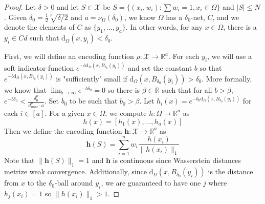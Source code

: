 \documentclass[12pt]{article}
\newcommand{\R}{\mathbb R}
\begin{document}
\begin{proof}
    Let $\delta > 0$ and let $S \in \mathcal{X}$ be $S = \{(x_i, w_i) : \sum w_i = 1, x_i \in \Omega\}$ and $|S| \leq N$. Given $\delta_0 = \frac{1}{2}\sqrt[p]{\delta/2}$ and $a = \nu_\Omega(\delta_0)$, we know $\Omega$ has a $\delta_0$-net, $C$, and we denote the elements of $C$ as  $\{y_1, \dots, y_a\}$. In other words, for any $x \in \Omega$, there is a $y_i \in Cd$ such that $\mathrm{d}_\Omega(x, y_i) < \delta_0$. 
    
    First, we will define an encoding function $\rho: \mathcal{X} \to \R^a$.  For each $y_i$, we will use a soft indicator function $e^{-b \mathrm{d}_{\Omega}(x , B_{\delta_0}(y_i))}$ and set the constant $b$ so that $e^{-b \mathrm{d}_\Omega(x, B_{\delta_0}(y_i))}$ is "sufficiently" small if $\mathrm{d}_\Omega(x, B_{\delta_0}(y_i)) > \delta_0$. More formally, we know that $\lim_{b \to \infty} e^{-b \delta_0} = 0$ so there is $\beta \in \R$ such that for all $b > \beta$, $e^{-b \delta_0} < \frac{\delta_0^p}{d_{max}^p \cdot a}$. Set $b_0$ to be such that $b_0 > \beta$. Let $h_i(x) = e^{-b_0 \mathrm{d}_\Omega(x, B_{\delta_0}(y_i))}$ for each $i \in [a]$. For a given $x \in \Omega$, we compute $h: \Omega \to \R^a$ as 
    \begin{equation*}
        h(x) = [h_1(x), \dots, h_a(x)]
    \end{equation*}
    Then we define the encoding function $\mathbf{h}: \mathcal{X} \to \R^a$ as 
    \begin{equation*}
        \mathbf{h}(S) = \sum_{i = 1}^n w_i \frac{h(x_i)}{\|h(x_i)\|_1}
    \end{equation*}
    Note that $\|\mathbf{h}(S)\|_1 = 1$ and $\mathbf{h}$ is continuous since Wasserstein distances metrize weak convergence. Additionally, since $\mathrm{d}_{\Omega}(x, B_{\delta_0}(y_i))$ is the distance from $x$ to the $\delta_0$-ball around $y_i$, we are guaranteed to have one $j$ where $h_j(x_i) = 1$ so $\|h(x_i)\|_1 > 1$.


\end{proof}
\end{document}

